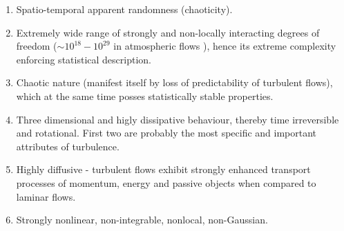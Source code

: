 \documentclass[../main.tex]{subfiles}
\begin{document}
\begin{enumerate}
\item Spatio-temporal apparent randomness (chaoticity).\\
\item Extremely wide range of strongly and non-locally interacting degrees of freedom ($\sim 10^{18}-10^{29}$ in atmospheric flows \citep{Orlanski1975}), hence its extreme complexity enforcing statistical description.\\
\item Chaotic nature (manifest itself by loss of predictability of turbulent flows), which at the same time posses statistically stable properties.\\
\item Three dimensional and higly dissipative behaviour, thereby time irreversible and rotational. First two are probably the most specific and important attributes of turbulence.\\
\item Highly diffusive - turbulent flows exhibit strongly enhanced transport processes of momentum, energy and passive objects when compared to laminar flows.\\
\item Strongly nonlinear, non-integrable, nonlocal, non-Gaussian.
\end{enumerate}
\end{document}
